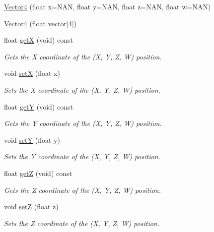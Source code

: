 \begin{DoxyCompactItemize}
\item 
\hyperlink{class_vector4_a8c0dbcc29bd3023f1ec32bd93023a209}{\-Vector4} (float x=\-N\-A\-N, float y=\-N\-A\-N, float z=\-N\-A\-N, float w=\-N\-A\-N)
\item 
\hyperlink{class_vector4_a6995caf87d59c9c8e9a565648e43b64c}{\-Vector4} (float vector\mbox{[}4\mbox{]})
\item 
float \hyperlink{class_vector4_a0d704b892717a8c5c7360956c9b7fe1d}{get\-X} (void) const 
\begin{DoxyCompactList}\small\item\em \-Gets the \-X coordinate of the (\-X, \-Y, \-Z, \-W) position. \end{DoxyCompactList}\item 
void \hyperlink{class_vector4_ae4ce17d214fdb71b1c00d42dc1f54b1b}{set\-X} (float x)
\begin{DoxyCompactList}\small\item\em \-Sets the \-X coordinate of the (\-X, \-Y, \-Z, \-W) position. \end{DoxyCompactList}\item 
float \hyperlink{class_vector4_aa432c84cd0c29b8aeb2204a5ab6fec39}{get\-Y} (void) const 
\begin{DoxyCompactList}\small\item\em \-Gets the \-Y coordinate of the (\-X, \-Y, \-Z, \-W) position. \end{DoxyCompactList}\item 
void \hyperlink{class_vector4_a802a9f7987d6589b64dfea11d062a6e9}{set\-Y} (float y)
\begin{DoxyCompactList}\small\item\em \-Sets the \-Y coordinate of the (\-X, \-Y, \-Z, \-W) position. \end{DoxyCompactList}\item 
float \hyperlink{class_vector4_a4760248a7756e406b6e91dc6efc5ffb8}{get\-Z} (void) const 
\begin{DoxyCompactList}\small\item\em \-Gets the \-Z coordinate of the (\-X, \-Y, \-Z, \-W) position. \end{DoxyCompactList}\item 
void \hyperlink{class_vector4_a64787391d1a10a6c88e9cf45ad79585b}{set\-Z} (float z)
\begin{DoxyCompactList}\small\item\em \-Sets the \-Z coordinate of the (\-X, \-Y, \-Z, \-W) position. \end{DoxyCompactList}\item 

\end{DoxyCompactItemize}

